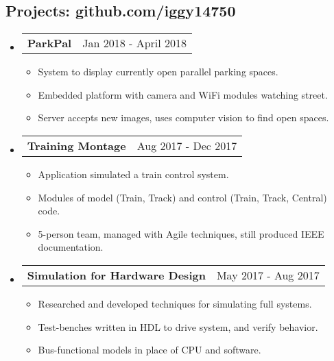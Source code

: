 \documentclass[18pt]{article}
\makeatletter
\providecommand{\tightlist}{
    \setlength{\itemsep}{0pt}\setlength{\parskip}{0pt}
}
\providecommand{\datetable}[2]{
    \begin{tabular*}{\textwidth}{@{}r @{\extracolsep{\fill}} l}
        #1 & #2
    \end{tabular*}
}
\makeatother
\begin{document}
    \subsection*{Projects: github.com/iggy14750}\label{projects}
    \begin{itemize}[label={}]\tightlist
        
        \item \datetable{\textbf{ParkPal}}
        {Jan 2018 - April 2018}
        \begin{itemize}\tightlist
            \item System to display currently open parallel parking spaces.
            \item Embedded platform with camera and WiFi modules watching street.
            \item Server accepts new images, uses computer vision to find open spaces.
        \end{itemize}

        \item \datetable{\textbf{Training Montage}}
        {Aug 2017 - Dec 2017}
        \begin{itemize}\tightlist
            \item Application simulated a train control system.
            \item Modules of model (Train, Track) and control (Train, Track, Central) code.
            \item 5-person team, managed with Agile techniques, still produced IEEE documentation.
        \end{itemize}

        \item \datetable{\textbf{Simulation for Hardware Design}}
        {May 2017 - Aug 2017}
        \begin{itemize}\tightlist
            \item Researched and developed techniques for simulating full systems.
            \item Test-benches written in HDL to drive system, and verify behavior.
            \item Bus-functional models in place of CPU and software.
        \end{itemize}
        
            

\end{itemize}
\end{document}
